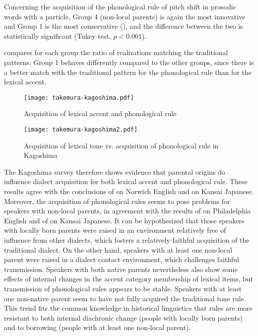 \documentclass[output=paper,colorlinks,citecolor=brown]{langscibook}
\begin{document}
Concerning the acquisition of the phonological rule of pitch shift in prosodic words with a particle, Group 4 (non-local parents) is again the most innovative and Group 1 is the most conservative (), and the difference between the two is statistically significant (Tukey test, $p < 0.001$).

 compares for each group the ratio of realizations matching the traditional patterns. Group 1 behaves differently compared to the other groups, since there is a better match with the traditional pattern for the phonological rule than for the lexical accent.

\begin{figure}
\texttt{[image: takemura-kagoshima.pdf]}
\caption{Acquisition of lexical accent and phonological rule}
\label{fig:kagoshima}
\end{figure}

\begin{figure}
\texttt{[image: takemura-kagoshima2.pdf]}
\caption{Acquisition of lexical tone vs. acquisition of phonological rule in Kagoshima}
\label{fig:kagoshima2}
\end{figure}
\pagebreak
The Kagoshima survey therefore shows evidence that parental origins do influence dialect acquisition for both lexical accent and phonological rule. These results agree with the conclusions of \citet{Trudgill1986} on Norwich English and \citet{SugitoOkumura1984} on Kansai Japanese. Moreover, the acquisition of phonological rules seems to pose problems for speakers with non-local parents, in agreement with the results of \citet{Payne1976} on Philadelphia English and of \citet{Takemura2010} on Kansai Japanese. It can be hypothesized that those speakers with locally born parents were raised in an environment relatively free of influence from other dialects, which fosters a relatively faithful acquisition of the traditional dialect. On the other hand, speakers with at least one non-local parent were raised in a dialect contact environment, which challenges faithful transmission. Speakers with both native parents nevertheless also show some effects of internal changes in the accent category membership of lexical items, but transmission of phonological rules appears to be stable. Speakers with at least one non-native parent seem to have not fully acquired the traditional tone rule. This trend fits the common knowledge in historical linguistics \citep{Hock1991} that rules are more resistant to both internal diachronic change (people with locally born parents) and to borrowing (people with at least one non-local parent). 
\end{document}
